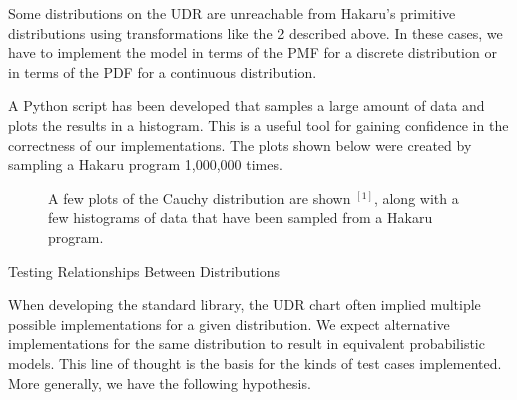 \documentclass[22pt]{beamer}
\newenvironment{variableblock}[3]{%
  \setbeamercolor{block body}{#2}
  \setbeamercolor{block title}{#3}
  \begin{block}{#1}}{\end{block}}
\begin{document}
\begin{frame}[fragile]
\begin{textblock}{5}
\begin{variableblock}{}{}{}
\scriptsize{Some distributions on the UDR are unreachable from Hakaru's primitive distributions using transformations like the 2 described above. In these cases, we have to implement the model in terms of the PMF for a discrete distribution or in terms of the PDF for a continuous distribution.}

\bigskip
\scriptsize{

A Python script has been developed that samples a large amount of data and plots the results in a histogram. This is a useful tool for gaining confidence in the correctness of our implementations. The plots shown below were created by sampling a Hakaru program 1,000,000 times. 
}

\begin{figure}[!tbp]
  \centering
  \caption{\tiny{A few plots of the Cauchy distribution are shown $^{[1]}$, along with a few histograms of data that have been sampled from a Hakaru program.}}
\end{figure}


\end{variableblock}


\begin{block}{\Large{Testing Relationships Between Distributions}}
\justifying

\scriptsize{When developing the standard library, the UDR chart often implied multiple possible implementations for a given distribution. We expect alternative implementations for the same distribution to result in equivalent probabilistic models. This line of thought is the basis for the kinds of test cases implemented. More generally, we have the following hypothesis.}


\end{block}
\end{textblock}
\end{frame}
\end{document}
